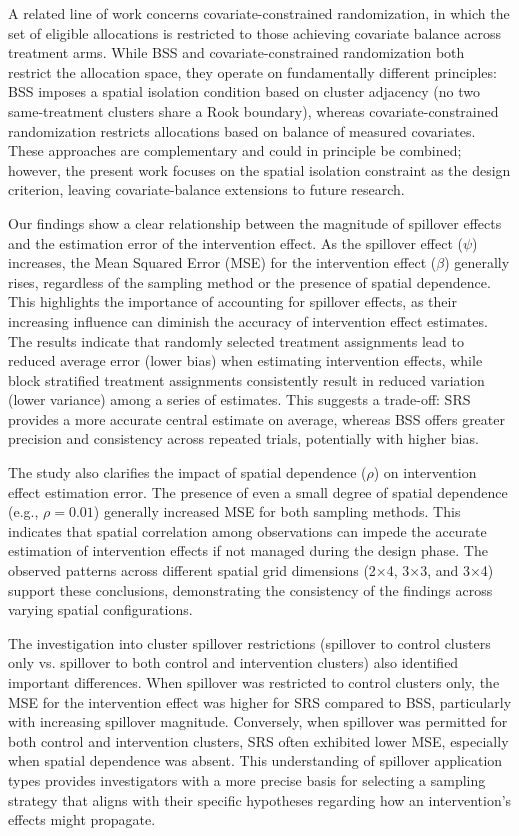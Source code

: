 \documentclass{article}[11pt]
\begin{document}
A related line of work concerns covariate-constrained randomization, in which the set of eligible allocations is restricted to those achieving covariate balance across treatment arms\cite{crisp_covariate-constrained_2023}. While BSS and covariate-constrained randomization both restrict the allocation space, they operate on fundamentally different principles: BSS imposes a spatial isolation condition based on cluster adjacency (no two same-treatment clusters share a Rook boundary), whereas covariate-constrained randomization restricts allocations based on balance of measured covariates. These approaches are complementary and could in principle be combined; however, the present work focuses on the spatial isolation constraint as the design criterion, leaving covariate-balance extensions to future research.

Our findings show a clear relationship between the magnitude of spillover effects and the estimation error of the intervention effect. As the spillover effect ($\psi$) increases, the Mean Squared Error (MSE) for the intervention effect ($\beta$) generally rises, regardless of the sampling method or the presence of spatial dependence. This highlights the importance of accounting for spillover effects, as their increasing influence can diminish the accuracy of intervention effect estimates. The results indicate that randomly selected treatment assignments lead to reduced average error (lower bias) when estimating intervention effects, while block stratified treatment assignments consistently result in reduced variation (lower variance) among a series of estimates. This suggests a trade-off: SRS provides a more accurate central estimate on average, whereas BSS offers greater precision and consistency across repeated trials, potentially with higher bias. 

The study also clarifies the impact of spatial dependence ($\rho$) on intervention effect estimation error. The presence of even a small degree of spatial dependence (e.g., $\rho=0.01$) generally increased MSE for both sampling methods. This indicates that spatial correlation among observations can impede the accurate estimation of intervention effects if not managed during the design phase. The observed patterns across different spatial grid dimensions (2×4, 3×3, and 3×4) support these conclusions, demonstrating the consistency of the findings across varying spatial configurations. 

The investigation into cluster spillover restrictions (spillover to control clusters only vs. spillover to both control and intervention clusters) also identified important differences. When spillover was restricted to control clusters only, the MSE for the intervention effect was higher for SRS compared to BSS, particularly with increasing spillover magnitude. Conversely, when spillover was permitted for both control and intervention clusters, SRS often exhibited lower MSE, especially when spatial dependence was absent. This understanding of spillover application types provides investigators with a more precise basis for selecting a sampling strategy that aligns with their specific hypotheses regarding how an intervention's effects might propagate.
\end{document}
